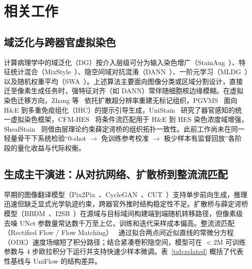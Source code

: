 \documentclass[journal]{IEEEtran}
\newcommand{\methodname}{UniFlow}
\begin{document}
\section{相关工作}
\subsection{域泛化与跨器官虚拟染色}
计算病理学中的域泛化（DG）按介入层级可分为输入染色增广（StainAug~\cite{ref_stainaug}）、特征统计混合（MixStyle~\cite{ref_mixstyle}）、隐空间域对抗混淆（DANN~\cite{ref_dann}）、一阶元学习（MLDG~\cite{ref_mldg}）以及随机权重平均（SWA~\cite{ref_swa}）。上述算法主要面向图像分类或区域分割设计，直接迁至像素生成任务时，强特征对齐（如 DANN）常伴随细胞核边缘模糊。在虚拟染色迁移方向，Zhang 等~\cite{ref_zhang} 依托扩散超分辨率重建无标记组织，PGVMS~\cite{ref_pgvms} 面向 H\&E 到多重免疫组化（IHC）的提示引导生成，UniStain~\cite{ref_unistain} 研究了器官感知的统一虚拟染色框架，CFM-HES~\cite{ref_cfmhes} 将条件流匹配用于 H\&E 到 HES 染色浓度域增强，SheafStain~\cite{ref_sheafstain} 则借由层理论约束薛定谔桥的组织拓扑一致性。此前工作尚未在同一轻量骨干下系统检验“0-shot $\to$ 免训练参考校准 $\to$ 极少样本有监督回放”各阶段的量化收益与代际权衡。

\subsection{生成主干演进：从对抗网络、扩散桥到整流流匹配}
早期的图像翻译模型（Pix2Pix~\cite{ref_pix2pix}、CycleGAN~\cite{ref_cyclegan}、CUT~\cite{ref_cut}）支持单步前向生成，推理迅速但缺乏显式光学轨迹约束，跨器官外推时结构稳定性不足。扩散桥与薛定谔桥模型（BBDM~\cite{ref_bbdm}、I2SB~\cite{ref_i2sb}）在源域与目标域间构建端到端随机转移路径，但像素级去噪 UNet 参数量常达数千万至上亿，训练和迭代采样成本偏高。整流流匹配（Rectified Flow / Flow Matching）~\cite{ref_flowmatch,ref_rectifiedflow} 通过拟合两点间近似直线的常微分方程（ODE）速度场缩短了积分路径；结合紧凑卷积隐空间，模型可在 $<2\text{M}$ 可训练参数与 4 步欧拉积分下运行并支持快速少样本微调。表~\ref{tab:related} 概括了代表性基线与 \methodname{} 的结构差异。
\end{document}
